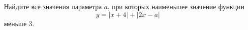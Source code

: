 \begin{ex}
	\begin{condition}
		Найдите все значения параметра \( a \), при которых наименьшее значение функции \[ y=|x+4|+|2x-a| \] меньше 3.
	\end{condition}
\end{ex}